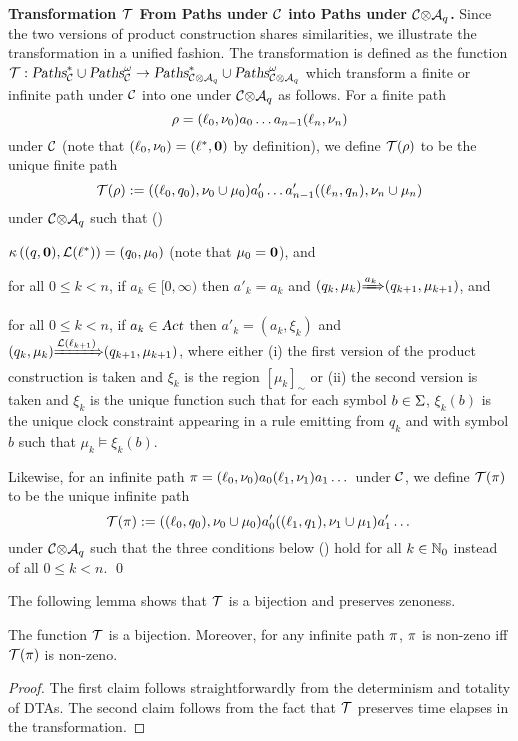 {\textbf{Transformation $\mathcal{T}$ From Paths under $\mathcal{C}$ into Paths under ${\mathcal{C}}{\otimes}{\mathcal{A}_q}$.}}
Since the two versions of product construction shares similarities, we illustrate the transformation in a unified fashion.
The transformation is defined as the function $\mathcal{T}:\mbox{\sl Paths}^*_{\mathcal{C}}\cup\mbox{\sl Paths}^\omega_{\mathcal{C}}\rightarrow \mbox{\sl Paths}^*_{{\mathcal{C}}{\otimes}{\mathcal{A}_q}}\cup\mbox{\sl Paths}^\omega_{{\mathcal{C}}{\otimes}{\mathcal{A}_q}}$
which transform a finite or infinite path under $\mathcal{C}$ into one under  ${\mathcal{C}}{\otimes}{\mathcal{A}_q}$ as follows.
For a finite path
\[
\rho=(\ell_0,\nu_0)a_0\dots a_{n-1}(\ell_n,\nu_n)
\]
under $\mathcal{C}$ (note that $(\ell_0,\nu_0)=(\ell^*, \mathbf{0})$ by definition),
we define $\mathcal{T}(\rho)$ to be the unique finite path
\begin{equation}\label{eq:trho}
\mathcal{T}(\rho):=((\ell_0,q_0),\nu_0\cup\mu_0)a'_0\dots a'_{n-1}((\ell_n,q_n),\nu_n\cup\mu_n)
\end{equation}
under ${\mathcal{C}}{\otimes}{\mathcal{A}_q}$ such that (\dag)
\begin{compactitem}
\item $\kappa\left((q,\mathbf{0}), \mathcal{L}(\ell^*)\right)=(q_0,\mu_0)$ (note that $\mu_0=\mathbf{0}$), and
\item for all $0\le k< n$, if $a_k\in [0,\infty)$ then $a'_k=a_k$ and ${(q_k,\mu_k)}{\xRightarrow{a_k}}{\left(q_{k+1},\mu_{k+1}\right)}$, and
\item for all $0\le k< n$, if $a_k\in\mbox{\sl Act}$ then $a'_k=(a_k,\xi_k)$ and ${(q_k,\mu_k)}{\xRightarrow{\mathcal{L}(\ell_{k+1})}}{\left(q_{k+1},\mu_{k+1}\right)}$, where either (i) the first version of the product construction is taken and $\xi_k$ is the region $\left[\mu_k\right]_\sim$ or (ii) the second version is taken and $\xi_k$ is the unique function such that for each symbol $b\in\Sigma$, $\xi_k(b)$ is the unique clock constraint appearing in a rule emitting from $q_k$ and with symbol $b$ such that $\mu_k\models\xi_k(b)$.
\end{compactitem}
Likewise, for an infinite path $\pi=(\ell_0,\nu_0)a_0(\ell_1,\nu_1)a_1\dots$
under $\mathcal{C}$, we define $\mathcal{T}(\pi)$ to be the unique infinite path
\[
\mathcal{T}(\pi):=((\ell_0,q_0),\nu_0\cup\mu_0)a'_0((\ell_1,q_1),\nu_1\cup\mu_1)a'_1\dots
\]
under ${\mathcal{C}}{\otimes}{\mathcal{A}_q}$ such that the three conditions below (\dag) hold for all $k\in\mathbb{N}_0$ instead of all $0\le k< n$.
\qed

The following lemma shows that $\mathcal{T}$ is a bijection and preserves zenoness.

\begin{lemma}\label{lemm:pfuncbij}
The function $\mathcal{T}$ is a bijection. Moreover, for any infinite path $\pi$, $\pi$ is non-zeno iff $\mathcal{T}(\pi)$ is non-zeno.
\end{lemma}
\begin{proof}
The first claim follows straightforwardly from the determinism and totality of DTAs.
The second claim follows from the fact that $\mathcal{T}$ preserves time elapses in the transformation.
\end{proof}


